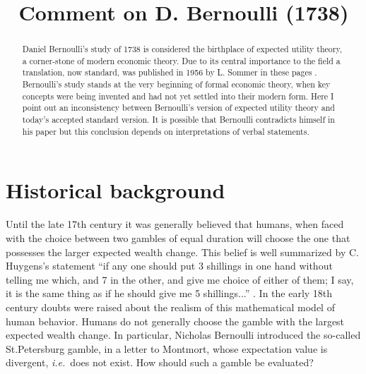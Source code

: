 \documentclass[dvips,draft]{ectaart}
\newcommand{\ie}{{\it i.e.}\ }
\newcommand{\seclabel}[1]{\label{section:#1}}
\begin{document}
\begin{frontmatter}

\title{Comment on D. Bernoulli (1738)}


\begin{aug}
\author{ }
\address{}
\end{aug}


\begin{abstract}
Daniel Bernoulli's study of 1738 is considered the birthplace of expected utility theory, a corner-stone of modern economic theory. Due to its central importance to the field a translation, now standard, was published in 1956 by L. Sommer in these pages \cite{Bernoulli1738}. Bernoulli's study stands at the very beginning of formal economic theory, when key concepts were being invented and had not yet settled into their modern form. Here I point out an inconsistency  between Bernoulli's version of expected utility theory and today's accepted standard version. It is possible that Bernoulli contradicts himself in his paper but this conclusion depends on interpretations of verbal statements.
\end{abstract}


\end{frontmatter}
\section{Historical background}
\seclabel{Historical}
Until the late 17th century it was generally believed that humans, when faced with the choice between two gambles of equal duration will choose the one that possesses the larger expected wealth change. This belief is well summarized by C. Huygens's statement ``if any one should put 3 shillings in one hand without telling me which, and 7 in the other, and give me choice of either of them; I say, it is the same thing as if he should give me 5 shillings...'' \cite{Huygens1657}. In the early 18th century doubts were raised about the realism of this mathematical model of human behavior. Humans do not generally choose the gamble with the largest expected wealth change. In particular, Nicholas Bernoulli introduced the so-called St.Petersburg gamble, in a letter to Montmort, whose expectation value is divergent, \ie does not exist. How should such a gamble be evaluated?
\end{document}
